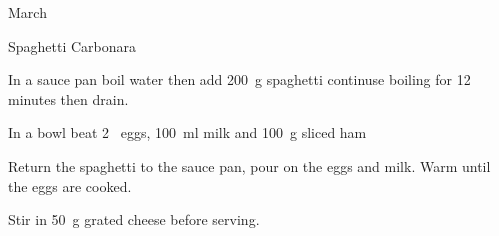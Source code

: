\begin{menu}{March}
\begin{recipe}{1}{Spaghetti Carbonara}
\begin{ingredients}
		\end{ingredients}
	
    \begin{instructions}
    \item 
      In a sauce pan boil water then add
      200~g  spaghetti
      continuse boiling for 12  minutes then drain.
    \item 
        In a bowl beat
        2~  eggs,
        100~ml  milk
        and
        100~g sliced ham\item 
        Return the spaghetti to the sauce pan,
        pour on the eggs and milk.
        Warm until the eggs are cooked.
      \item 
        Stir in
        50~g grated cheese
      before serving.
      
    \end{instructions}
    \end{recipe}%
  
    \clearpage
    \end{menu}
	
